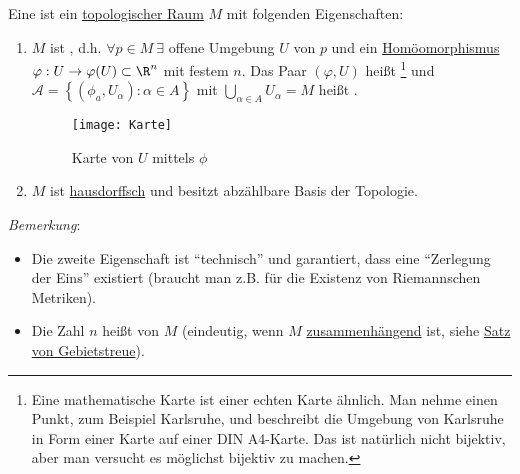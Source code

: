 \begin{definition}\label{def:topologischeMannigfaltigkeit}
  Eine  ist ein \hyperref[def:topologie]{topologischer Raum} \( M \) mit folgenden Eigenschaften:
  \begin{enumerate}
    \item \( M \) ist \label{def:lokalEuklidisch}, d.h. \( \forall p \in M \ \exists \) offene Umgebung \( U \) von \( p \) und ein \hyperref[def:homoeomorphismus]{Homöomorphismus} \( \varphi: U \to \varphi(U) \subset \R^n \) mit festem \( n \). Das Paar \( (\varphi, U) \) heißt \label{def:karte}\footnote{Eine mathematische Karte ist einer echten Karte ähnlich. Man nehme einen Punkt, zum Beispiel Karlsruhe, und beschreibt die Umgebung von Karlsruhe in Form einer Karte auf einer DIN A4-Karte. Das ist natürlich nicht bijektiv, aber man versucht es möglichst bijektiv zu machen.} und \( \mathcal{A} = \left \{ (\phi_a, U_\alpha) : \alpha \in A \right \} \) mit \( \bigcup_{\alpha \in A}U_\alpha = M \) heißt \label{def:atlas}.
    \begin{figure}[H]
      \texttt{[image: Karte]}
      \caption{Karte von \( U \) mittels \( \phi \)}
    \end{figure}
    \item \( M \) ist \hyperref[def:hausdorffsch]{hausdorffsch} und besitzt abzählbare Basis der Topologie.
  \end{enumerate}
  \emph{Bemerkung}:
  \begin{itemize}
    \item Die zweite Eigenschaft ist ``technisch'' und garantiert, dass eine ``Zerlegung der Eins'' existiert (braucht man z.B. für die Existenz von Riemannschen Metriken). 
    \item Die Zahl \( n \) heißt \label{def:dimension} von \( M \) (eindeutig, wenn \( M \) \hyperref[def:zusammenhaengend]{zusammenhängend} ist, siehe \hyperref[th:satzGebietstreue]{Satz von Gebietstreue}). 
  \end{itemize}
\end{definition}

